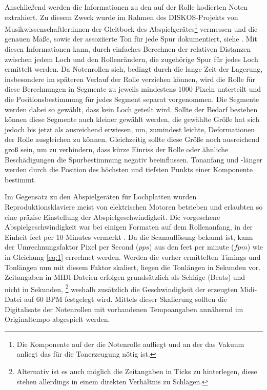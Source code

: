 Anschließend werden die Informationen zu den auf der Rolle kodierten Noten extrahiert.
Zu diesem Zweck wurde im Rahmen des DISKOS-Projekts von Musikwissenschaftler:innen der Gleitbock des Abspielgerätes\footnote{Die Komponente auf der die Notenrolle aufliegt und an der das Vakuum anliegt das für die Tonerzeugung nötig ist.} vermessen und die genauen Maße, sowie der assoziierte Ton für jede Spur dokumentiert, siehe \textcite[]{mxp_2002548}.
Mit diesen Informationen kann, durch einfaches Berechnen der relativen Distanzen zwischen jedem Loch und den Rollenrändern, die zugehörige Spur für jedes Loch ermittelt werden.
Da Notenrollen sich, bedingt durch die lange Zeit der Lagerung, insbesondere im späteren Verlauf der Rolle verziehen können, wird die Rolle für diese Berechnungen in Segmente zu jeweils mindestens 1000 Pixeln unterteilt und die Positionsbestimmung für jedes Segment separat vorgenommen.
Die Segmente werden dabei so gewählt, dass kein Loch geteilt wird.
Sollte der Bedarf bestehen können diese Segmente auch kleiner gewählt werden, die gewählte Größe hat sich jedoch bis jetzt als ausreichend erwiesen, um, zumindest leichte, Deformationen der Rolle ausgleichen zu können.
Gleichzeitig sollte diese Größe noch ausreichend groß sein, um zu verhindern, dass kürze Einriss der Rolle oder ähnliche Beschädigungen die Spurbestimmung negativ beeinflussen.
Tonanfang und -länger werden durch die Position des höchsten und tiefsten Punkts einer Komponente bestimmt.

Im Gegensatz zu den Abspielgeräten für Lochplatten wurden Reproduktionsklaviere meist von elektrischen Motoren betrieben und erlaubten so eine präzise Einstellung der Abspielgeschwindigkeit.
Die vorgesehene Abspielgeschwindigkeit war bei einigen Formaten auf dem Rollenanfang, in der Einheit feet per 10 Minutes vermerkt \parencite[63]{colmenares_2011}.
Da die Scanauflösung bekannt ist, kann der Umrechnungsfaktor Pixel per Second ($pps$) aus den feet per minute ($fpm$) wie in Gleichung \ref{eq:1} errechnet werden.
Werden die vorher ermittelten Timings und Tonlängen nun mit diesem Faktor skaliert, liegen die Tonlängen in Sekunden vor.
Zeitangaben in MIDI-Dateien erfolgen grundsätzlich als Schläge (Beats) und nicht in Sekunden, \footnote{Alternativ ist es auch möglich die Zeitangaben in Ticks zu hinterlegen, diese stehen allerdings in einem direkten Verhältnis zu Schlägen.} weshalb zusätzlich die Geschwindigkeit der erzeugten Midi-Datei auf 60 BPM festgelegt wird.
Mittels dieser Skalierung sollten die Digitalisate der Notenrollen mit vorhandenen Tempoangaben annähernd im Originaltempo abgespielt werden.

